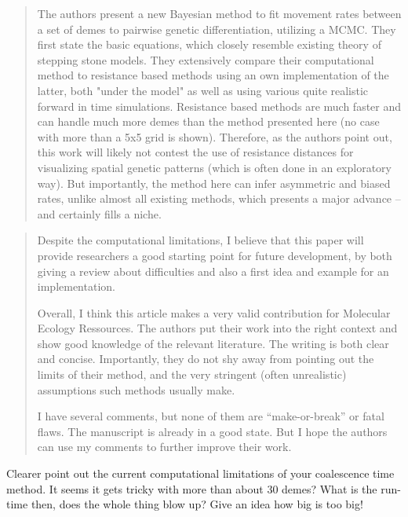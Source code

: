 
\begin{quote}
    The authors present a new Bayesian method to fit movement rates between a
    set of demes to pairwise genetic differentiation, utilizing a MCMC. They first
    state the basic equations, which closely resemble existing theory of stepping
    stone models. They extensively compare their computational method to resistance
    based methods using an own implementation of the latter, both "under the model"
    as well as using various quite realistic forward in time simulations.
    Resistance based methods are much faster and can handle much more demes than
    the method presented here (no case with more than a 5x5 grid is shown).
    Therefore, as the authors point out, this work will likely not contest the use
    of resistance distances for visualizing spatial genetic patterns (which is
    often done in an exploratory way). But importantly, the method here can infer
    asymmetric and biased rates, unlike almost all existing methods, which presents
    a major advance -- and certainly fills a niche.  
\end{quote}

\begin{quote}
    Despite the computational limitations, I believe that this paper will provide
    researchers a good starting point for future development, by both giving a
    review about difficulties and also a first idea and example for an
    implementation.

    Overall, I think this article makes a very valid contribution for Molecular
    Ecology Ressources. The authors put their work into the right context and
    show good knowledge of the relevant literature. The writing is both clear
    and concise. Importantly, they do not shy away from pointing out the limits
    of their method, and the very stringent (often unrealistic) assumptions
    such methods usually make.

    I have several comments, but none of them are ``make-or-break'' or fatal flaws.
    The manuscript is already in a good state. But I hope the authors can use my
    comments to further improve their work.  
\end{quote}


\begin{point}{}
    Clearer point out the current computational limitations of your coalescence
time method. It seems it gets tricky with more than about 30 demes? What is the
run-time then, does the whole thing blow up? Give an idea how big is too big!
\end{point}

